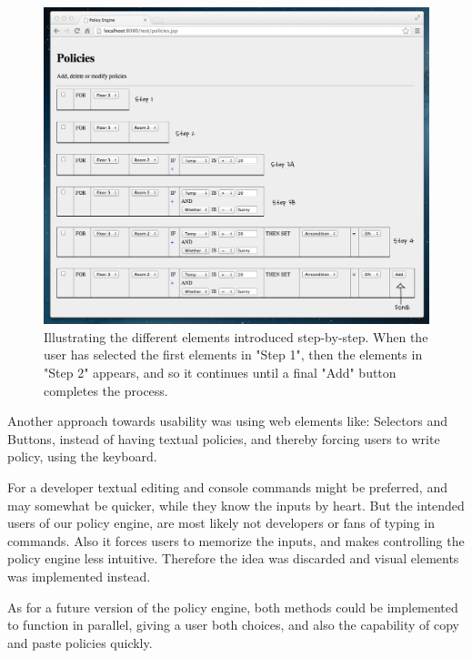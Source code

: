 \begin{figure}[h!]
\centering
\includegraphics[width=\columnwidth]{building_policy_steps.png}
\caption{Illustrating the different elements introduced step-by-step. When the user has selected the first elements in "Step 1", then the elements in "Step 2" appears, and so it continues until a final "Add" button completes the process.}
\label{fig:building_policy_steps}
\end{figure}

Another approach towards usability was using web elements like: Selectors and Buttons, instead of having textual policies, and thereby forcing users to write policy, using the keyboard.

For a developer textual editing and console commands might be preferred, and may somewhat be quicker, while they know the inputs by heart. But the intended users of our policy engine, are most likely not developers or fans of typing in commands.
Also it forces users to memorize the inputs, and makes controlling the policy engine less intuitive. Therefore the idea was discarded and visual elements was implemented instead.

As for a future version of the policy engine, both methods could be implemented to function in parallel, giving a user both choices, and also the capability of copy and paste policies quickly.